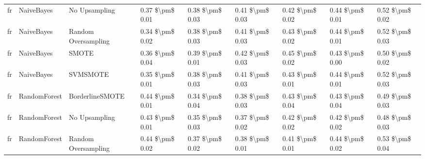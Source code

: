 \begin{tabular}{lllllllll}
      fr &                      NaiveBayes &                 No Upsampling & 0.37 \$\textbackslash pm\$ 0.01 &           0.38 \$\textbackslash pm\$ 0.03 &       0.41 \$\textbackslash pm\$ 0.03 &        0.42 \$\textbackslash pm\$ 0.02 &                         0.44 \$\textbackslash pm\$ 0.01 &     0.52 \$\textbackslash pm\$ 0.02 \\
      fr &                      NaiveBayes &           Random Oversampling & 0.34 \$\textbackslash pm\$ 0.02 &           0.38 \$\textbackslash pm\$ 0.03 &       0.41 \$\textbackslash pm\$ 0.03 &        0.43 \$\textbackslash pm\$ 0.02 &                         0.44 \$\textbackslash pm\$ 0.01 &     0.52 \$\textbackslash pm\$ 0.03 \\
      fr &                      NaiveBayes &                         SMOTE & 0.36 \$\textbackslash pm\$ 0.04 &           0.39 \$\textbackslash pm\$ 0.01 &       0.42 \$\textbackslash pm\$ 0.03 &        0.45 \$\textbackslash pm\$ 0.02 &                         0.43 \$\textbackslash pm\$ 0.00 &     0.50 \$\textbackslash pm\$ 0.02 \\
      fr &                      NaiveBayes &                      SVMSMOTE & 0.35 \$\textbackslash pm\$ 0.01 &           0.38 \$\textbackslash pm\$ 0.03 &       0.41 \$\textbackslash pm\$ 0.03 &        0.43 \$\textbackslash pm\$ 0.01 &                         0.44 \$\textbackslash pm\$ 0.01 &     0.52 \$\textbackslash pm\$ 0.03 \\
      fr &                    RandomForest &               BorderlineSMOTE & 0.44 \$\textbackslash pm\$ 0.01 &           0.34 \$\textbackslash pm\$ 0.04 &       0.38 \$\textbackslash pm\$ 0.03 &        0.43 \$\textbackslash pm\$ 0.04 &                         0.43 \$\textbackslash pm\$ 0.04 &     0.49 \$\textbackslash pm\$ 0.03 \\
      fr &                    RandomForest &                 No Upsampling & 0.43 \$\textbackslash pm\$ 0.01 &           0.35 \$\textbackslash pm\$ 0.03 &       0.37 \$\textbackslash pm\$ 0.02 &        0.42 \$\textbackslash pm\$ 0.02 &                         0.42 \$\textbackslash pm\$ 0.02 &     0.48 \$\textbackslash pm\$ 0.03 \\
      fr &                    RandomForest &           Random Oversampling & 0.44 \$\textbackslash pm\$ 0.02 &           0.37 \$\textbackslash pm\$ 0.02 &       0.38 \$\textbackslash pm\$ 0.01 &        0.41 \$\textbackslash pm\$ 0.01 &                         0.44 \$\textbackslash pm\$ 0.02 &     0.53 \$\textbackslash pm\$ 0.04 \\

\end{tabular}
